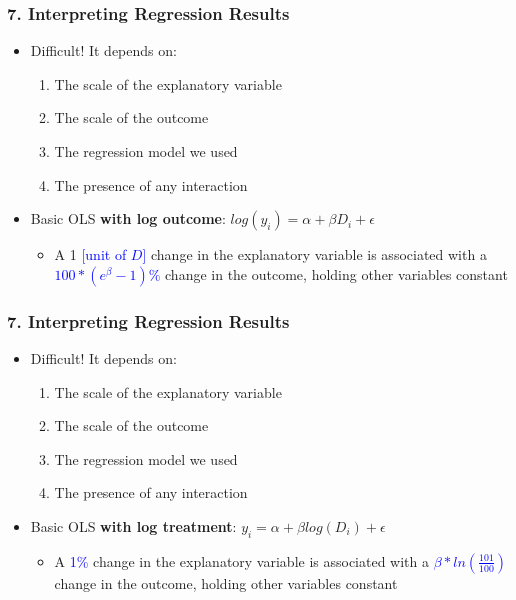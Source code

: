 \documentclass[xcolor=x11names,compress]{beamer}\usepackage[]{graphicx}\usepackage[]{color}
\renewcommand{\(}{\begin{columns}}
\renewcommand{\)}{\end{columns}}
\newcommand{\<}[1]{\begin{column}{#1}}
\renewcommand{\>}{\end{column}}
\begin{document}
\begin{frame}
\frametitle{7. Interpreting Regression Results}
\begin{itemize}
\item Difficult! It depends on:
\begin{enumerate}
\item The scale of the explanatory variable
\item The scale of the outcome
\item The regression model we used
\item The presence of any interaction
\end{enumerate}
\item Basic OLS \textbf{with log outcome}: $log(y_i) = \alpha + \beta D_i + \epsilon$
\begin{itemize}
\item A 1 \textcolor{blue}{[unit of $D$]} change in the explanatory variable is associated with a  \textcolor{blue}{$100*(e^{\beta}-1)\%$} change in the outcome, holding other variables constant
\end{itemize}
\end{itemize}
\end{frame}

\begin{frame}
\frametitle{7. Interpreting Regression Results}
\begin{itemize}
\item Difficult! It depends on:
\begin{enumerate}
\item The scale of the explanatory variable
\item The scale of the outcome
\item The regression model we used
\item The presence of any interaction
\end{enumerate}
\item Basic OLS \textbf{with log treatment}: $y_i = \alpha + \beta log(D_i) + \epsilon$
\begin{itemize}
\item A \textcolor{blue}{1\%} change in the explanatory variable is associated with a  \textcolor{blue}{$\beta*ln(\frac{101}{100})$} change in the outcome, holding other variables constant
\end{itemize}
\end{itemize}
\end{frame}
\end{document}
